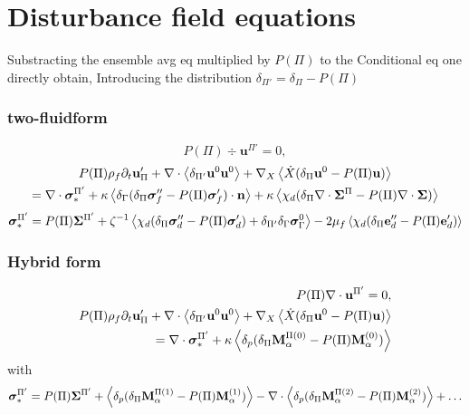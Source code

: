 \documentclass[12pt]{My_preprint}
\begin{document}
\section{Disturbance field equations}


Substracting the ensemble avg eq multiplied by $P(\Pi)$ to the Conditional eq one directly obtain, 
Introducing the distribution $\delta_{\Pi'} = \delta_\Pi - P(\Pi)$

\subsubsection*{two-fluidform}
\begin{equation}
    P(\Pi) \div \textbf{u}^{\Pi'} = 0,
\end{equation}
\begin{multline}
    P(\Pi) \rho_f\partial_t \textbf{u}_\Pi'
    + \mathbf{\nabla}\cdot \left<\delta_{\Pi'} \textbf{u}^0\textbf{u}^0\right>
    + \mathbf{\nabla}_X \left<\dot{X} (\delta_{\Pi} \textbf{u}^0 - P(\Pi) \textbf{u})\right>\\
   = 
   \mathbf{\nabla}\cdot \bm\sigma_*^{\Pi'}
   +\kappa\left<\delta_\Gamma(\delta_\Pi \bm\sigma_f'' - P(\Pi) \bm\sigma_f')\cdot \textbf{n}\right>
   +\kappa\left< \chi_d (\delta_\Pi\mathbf{\nabla}\cdot \bm\Sigma^\Pi- P(\Pi) \mathbf{\nabla}\cdot\bm\Sigma)\right>
\end{multline}
\begin{equation}
    \bm\sigma_*^{\Pi'} = 
    P(\Pi)\bm\Sigma^{\Pi'}
    + \zeta^{-1}\left<\chi_d (\delta_\Pi\bm\sigma_d'' - P(\Pi) \bm\sigma_d')
    + \delta_{\Pi'}\delta_\Gamma \bm\sigma_\Gamma^0\right>
    -  2\mu_f\left< \chi_d   (\delta_\Pi\textbf{e}_d'' -P(\Pi)\textbf{e}_d') \right>
 \end{equation}

\subsubsection*{Hybrid form}
\begin{align}
    P(\Pi) \mathbf{\nabla}\cdot \textbf{u}^{\Pi'} = 0, \\
    P(\Pi) \rho_f\partial_t \textbf{u}_\Pi'
   + \mathbf{\nabla}\cdot \left<\delta_{\Pi'} \textbf{u}^0\textbf{u}^0\right>
   + \mathbf{\nabla}_X \left<\dot{X} (\delta_{\Pi} \textbf{u}^0 - P(\Pi) \textbf{u})\right>\\
    = 
   \mathbf{\nabla}\cdot \bm\sigma_*^{\Pi'}
   +\kappa\left<\delta_{p} (
    \delta_\Pi\textbf{M}_\alpha^{\Pi(0)}
    - P(\Pi)\textbf{M}_\alpha^{(0)}
   )\right>
\end{align}
with 
\begin{equation}
    \bm\sigma_*^{\Pi'} = 
    P(\Pi)\bm\Sigma^{\Pi'}
    + \left<\delta_{p} (
        \delta_\Pi \textbf{M}_\alpha^{\Pi(1)}
        - P(\Pi) \textbf{M}_\alpha^{(1)}
    )\right>
    - \mathbf{\nabla}\cdot \left<\delta_{p} 
        (\delta_\Pi\textbf{M}_\alpha^{\Pi(2)}
        - P(\Pi)\textbf{M}_\alpha^{(2)})
        \right>
    + \ldots
\end{equation}
\end{document}
